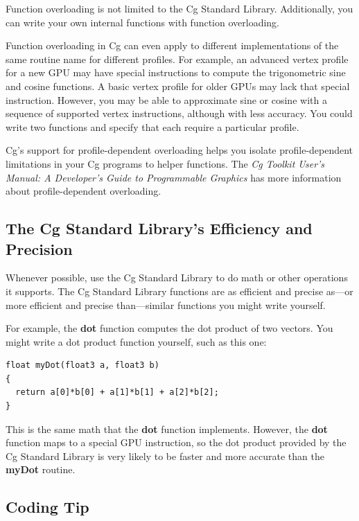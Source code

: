 \documentclass{book}
\begin{document}
Function overloading is not limited to the Cg Standard Library. Additionally, you can write your own internal functions with function overloading.

Function overloading in Cg can even apply to different implementations of the same routine name for different profiles. For example, an advanced vertex profile for a new GPU may have special instructions to compute the trigonometric sine and cosine functions. A basic vertex profile for older GPUs may lack that special instruction. However, you may be able to approximate sine or cosine with a sequence of supported vertex instructions, although with less accuracy. You could write two functions and specify that each require a particular profile.

Cg's support for profile-dependent overloading helps you isolate profile-dependent limitations in your Cg programs to helper functions. The \textit{Cg Toolkit User's Manual: A Developer's Guide to Programmable Graphics} has more information about profile-dependent overloading.

\subsection*{The Cg Standard Library's Efficiency and Precision}

Whenever possible, use the Cg Standard Library to do math or other operations it supports. The Cg Standard Library functions are as efficient and precise as—or more efficient and precise than—similar functions you might write yourself.

For example, the \textbf{dot} function computes the dot product of two vectors. You might write a dot product function yourself, such as this one:

\FloatBarrier
\begin{lstlisting}
float myDot(float3 a, float3 b)
{
  return a[0]*b[0] + a[1]*b[1] + a[2]*b[2];
}
\end{lstlisting}
\FloatBarrier

This is the same math that the \textbf{dot} function implements. However, the \textbf{dot} function maps to a special GPU instruction, so the dot product provided by the Cg Standard Library is very likely to be faster and more accurate than the \textbf{myDot} routine.

\subsection*{Coding Tip}
\end{document}

